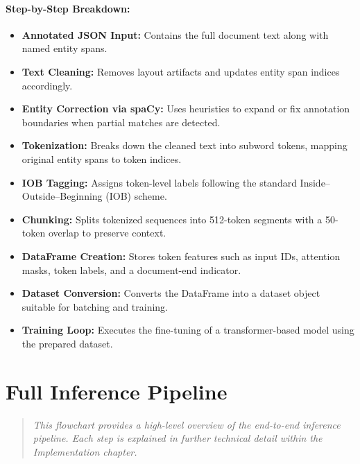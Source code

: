 \documentclass{article}
\begin{document}
\paragraph{Step-by-Step Breakdown:}
\begin{itemize}
    \item \textbf{Annotated JSON Input:} Contains the full document text along with named entity spans.
    \item \textbf{Text Cleaning:} Removes layout artifacts and updates entity span indices accordingly.
    \item \textbf{Entity Correction via spaCy:} Uses heuristics to expand or fix annotation boundaries when partial matches are detected.
    \item \textbf{Tokenization:} Breaks down the cleaned text into subword tokens, mapping original entity spans to token indices.
    \item \textbf{IOB Tagging:} Assigns token-level labels following the standard Inside–Outside–Beginning (IOB) scheme.
    \item \textbf{Chunking:} Splits tokenized sequences into 512-token segments with a 50-token overlap to preserve context.
    \item \textbf{DataFrame Creation:} Stores token features such as input IDs, attention masks, token labels, and a document-end indicator.
    \item \textbf{Dataset Conversion:} Converts the DataFrame into a dataset object suitable for batching and training.
    \item \textbf{Training Loop:} Executes the fine-tuning of a transformer-based model using the prepared dataset.
\end{itemize}

\section*{Full Inference Pipeline}

\begin{quote}
\emph{This flowchart provides a high-level overview of the end-to-end inference pipeline. Each step is explained in further technical detail within the Implementation chapter.}
\end{quote}
\end{document}
